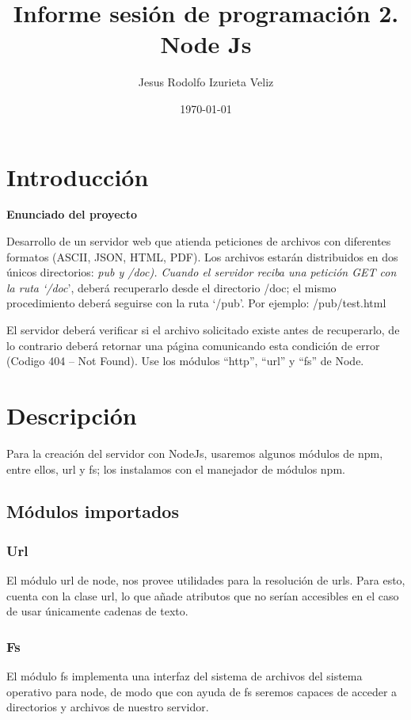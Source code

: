 \documentclass[11pt]{article}
\author{Jesus Rodolfo Izurieta Veliz}
\date{\today}
\title{Informe sesión de programación 2. Node Js}
\begin{document}
\maketitle
\tableofcontents

\pagebreak

\section{Introducción}
\label{sec:org09fb854}
\textbf{Enunciado del proyecto}

Desarrollo de un servidor web que atienda peticiones de archivos con diferentes formatos (ASCII, JSON, HTML, PDF).
Los archivos estarán distribuidos en dos únicos directorios: \emph{pub y /doc).
Cuando el servidor reciba una petición GET con la ruta ‘/doc}', deberá recuperarlo desde el directorio /doc;
el mismo procedimiento deberá seguirse con la ruta ‘/pub'. Por ejemplo: /pub/test.html

El servidor deberá verificar si el archivo solicitado existe antes de recuperarlo,
de lo contrario deberá retornar una página comunicando esta condición de error (Codigo 404 – Not Found).
Use los módulos “http”, “url” y “fs” de Node.

\section{Descripción}
\label{sec:org60b8877}
Para la creación del servidor con NodeJs, usaremos algunos módulos de npm,
entre ellos, url y fs; los instalamos con el manejador de módulos npm.

\subsection{Módulos importados}
\label{sec:org3fc123c}

\subsubsection{Url}
\label{sec:org803fb4d}
El módulo url de node, nos provee utilidades para la resolución de urls.
Para esto, cuenta con la clase url, lo que añade atributos que no serían accesibles en el caso de usar únicamente cadenas de texto.

\subsubsection{Fs}
\label{sec:org95ed0de}
El módulo fs implementa una interfaz del sistema de archivos del sistema operativo para node,
de modo que con ayuda de fs seremos capaces de acceder a directorios y archivos de nuestro servidor.
\end{document}
